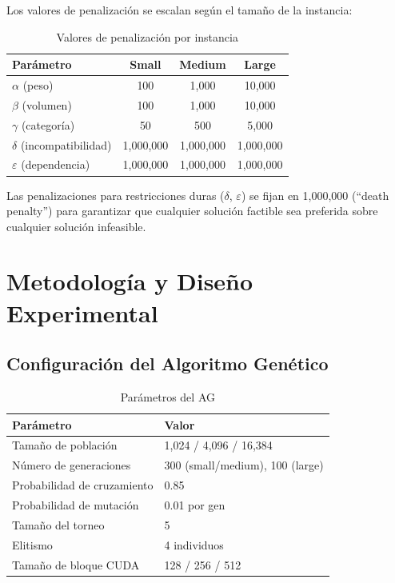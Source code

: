 \documentclass[12pt,a4paper]{article}
\begin{document}
Los valores de penalizaci\'on se escalan seg\'un el tama\~no de la instancia:

\begin{table}[H]
\centering
\caption{Valores de penalizaci\'on por instancia}
\begin{tabular}{lccc}
\toprule
\textbf{Par\'ametro} & \textbf{Small} & \textbf{Medium} & \textbf{Large} \\
\midrule
$\alpha$ (peso) & 100 & 1,000 & 10,000 \\
$\beta$ (volumen) & 100 & 1,000 & 10,000 \\
$\gamma$ (categor\'ia) & 50 & 500 & 5,000 \\
$\delta$ (incompatibilidad) & 1,000,000 & 1,000,000 & 1,000,000 \\
$\varepsilon$ (dependencia) & 1,000,000 & 1,000,000 & 1,000,000 \\
\bottomrule
\end{tabular}
\end{table}

Las penalizaciones para restricciones duras ($\delta$, $\varepsilon$) se fijan en 1,000,000 (``death penalty'') para garantizar que cualquier soluci\'on factible sea preferida sobre cualquier soluci\'on infeasible.

\section{Metodolog\'ia y Dise\~no Experimental}

\subsection{Configuraci\'on del Algoritmo Gen\'etico}

\begin{table}[H]
\centering
\caption{Par\'ametros del AG}
\begin{tabular}{ll}
\toprule
\textbf{Par\'ametro} & \textbf{Valor} \\
\midrule
Tama\~no de poblaci\'on & 1,024 / 4,096 / 16,384 \\
N\'umero de generaciones & 300 (small/medium), 100 (large) \\
Probabilidad de cruzamiento & 0.85 \\
Probabilidad de mutaci\'on & 0.01 por gen \\
Tama\~no del torneo & 5 \\
Elitismo & 4 individuos \\
Tama\~no de bloque CUDA & 128 / 256 / 512 \\
\bottomrule
\end{tabular}
\end{table}
\end{document}
